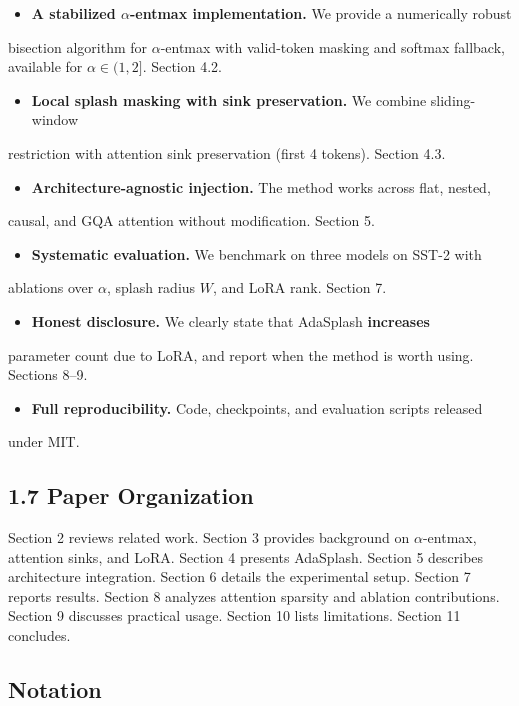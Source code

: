 \begin{itemize}
\item \textbf{A stabilized $\alpha$-entmax implementation.} We provide a numerically robust
\end{itemize}
  bisection algorithm for $\alpha$-entmax with valid-token masking and softmax 
  fallback, available for $\alpha \in (1, 2]$. Section 4.2.
\begin{itemize}
\item \textbf{Local splash masking with sink preservation.} We combine sliding-window
\end{itemize}
  restriction with attention sink preservation (first 4 tokens). Section 4.3.
\begin{itemize}
\item \textbf{Architecture-agnostic injection.} The method works across flat, nested,
\end{itemize}
  causal, and GQA attention without modification. Section 5.
\begin{itemize}
\item \textbf{Systematic evaluation.} We benchmark on three models on SST-2 with
\end{itemize}
  ablations over $\alpha$, splash radius $W$, and LoRA rank. Section 7.
\begin{itemize}
\item \textbf{Honest disclosure.} We clearly state that AdaSplash \textbf{increases}
\end{itemize}
  parameter count due to LoRA, and report when the method is worth using. 
  Sections 8--9.
\begin{itemize}
\item \textbf{Full reproducibility.} Code, checkpoints, and evaluation scripts released
\end{itemize}
  under MIT.

\subsection{1.7 Paper Organization}

Section 2 reviews related work. Section 3 provides background on $\alpha$-entmax, 
attention sinks, and LoRA. Section 4 presents AdaSplash. Section 5 describes 
architecture integration. Section 6 details the experimental setup. Section 7 
reports results. Section 8 analyzes attention sparsity and ablation 
contributions. Section 9 discusses practical usage. Section 10 lists 
limitations. Section 11 concludes.



\subsection{Notation}
